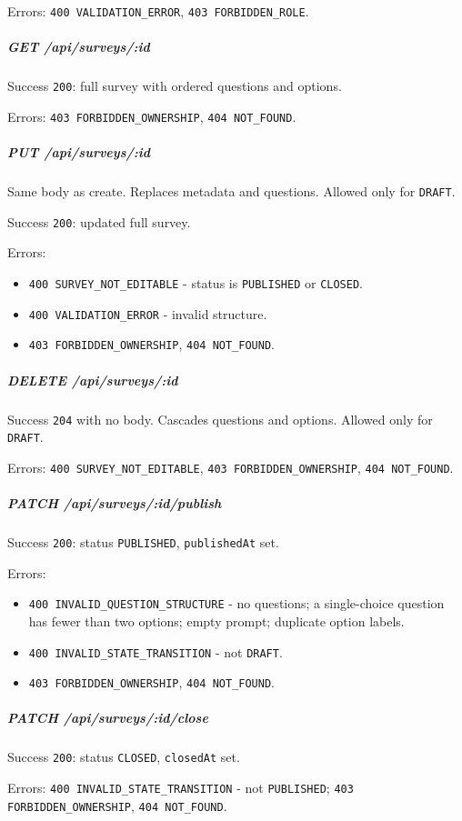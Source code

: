 \documentclass[12pt,a4paper]{article}
\begin{document}
Errors: \texttt{400 VALIDATION\_ERROR}, \texttt{403 FORBIDDEN\_ROLE}.

\subparagraph*{GET /api/surveys/:id}
Success \texttt{200}: full survey with ordered questions and options.

Errors: \texttt{403 FORBIDDEN\_OWNERSHIP}, \texttt{404 NOT\_FOUND}.

\subparagraph*{PUT /api/surveys/:id}
Same body as create. Replaces metadata and questions. Allowed only for \texttt{DRAFT}.

Success \texttt{200}: updated full survey.

Errors:

\begin{itemize}[leftmargin=*]
\item \texttt{400 SURVEY\_NOT\_EDITABLE} - status is \texttt{PUBLISHED} or \texttt{CLOSED}.
\item \texttt{400 VALIDATION\_ERROR} - invalid structure.
\item \texttt{403 FORBIDDEN\_OWNERSHIP}, \texttt{404 NOT\_FOUND}.
\end{itemize}

\subparagraph*{DELETE /api/surveys/:id}
Success \texttt{204} with no body. Cascades questions and options. Allowed only for \texttt{DRAFT}.

Errors: \texttt{400 SURVEY\_NOT\_EDITABLE}, \texttt{403 FORBIDDEN\_OWNERSHIP}, \texttt{404 NOT\_FOUND}.

\subparagraph*{PATCH /api/surveys/:id/publish}
Success \texttt{200}: status \texttt{PUBLISHED}, \texttt{publishedAt} set.

Errors:

\begin{itemize}[leftmargin=*]
\item \texttt{400 INVALID\_QUESTION\_STRUCTURE} - no questions; a single-choice question has fewer than two options; empty prompt; duplicate option labels.
\item \texttt{400 INVALID\_STATE\_TRANSITION} - not \texttt{DRAFT}.
\item \texttt{403 FORBIDDEN\_OWNERSHIP}, \texttt{404 NOT\_FOUND}.
\end{itemize}

\subparagraph*{PATCH /api/surveys/:id/close}
Success \texttt{200}: status \texttt{CLOSED}, \texttt{closedAt} set.

Errors: \texttt{400 INVALID\_STATE\_TRANSITION} - not \texttt{PUBLISHED}; \texttt{403 FORBIDDEN\_OWNERSHIP}, \texttt{404 NOT\_FOUND}.
\end{document}
